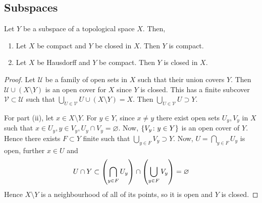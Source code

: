 \subsection{Subspaces}
\begin{theorem}
	Let \( Y \) be a subspace of a topological space \( X \).
	Then,
	\begin{enumerate}
		\item Let \( X \) be compact and \( Y \) be closed in \( X \).
		      Then \( Y \) is compact.
		\item Let \( X \) be Hausdorff and \( Y \) be compact.
		      Then \( Y \) is closed in \( X \).
	\end{enumerate}
\end{theorem}
\begin{proof}
	Let \( \mathcal U \) be a family of open sets in \( X \) such that their union covers \( Y \).
	Then \( \mathcal U \cup (X \setminus Y) \) is an open cover for \( X \) since \( Y \) is closed.
	This has a finite subcover \( \mathcal V \subset \mathcal U \) such that \( \bigcup_{U \in \mathcal V} U \cup (X \setminus Y) = X \).
	Then \( \bigcup_{U \in \mathcal V} U \supset Y \).

	For part (ii), let \( x \in X \setminus Y \).
	For \( y \in Y \), since \( x \neq y \) there exist open sets \( U_y, V_y \) in \( X \) such that \( x \in U_y, y \in V_y, U_y \cap V_y = \varnothing \).
	Now, \( \qty{V_y \colon y \in Y} \) is an open cover of \( Y \).
	Hence there exists \( F \subset Y \) finite such that \( \bigcup_{y \in F} V_y \supset Y \).
	Now, \( U = \bigcap_{y \in F} U_y \) is open, further \( x \in U \) and
	\[
		U \cap Y \subset \qty(\bigcap_{y \in F} U_y) \cap \qty(\bigcup_{y \in F} V_y) = \varnothing
	\]
	Hence \( X \setminus Y \) is a neighbourhood of all of its points, so it is open and \( Y \) is closed.
\end{proof}

